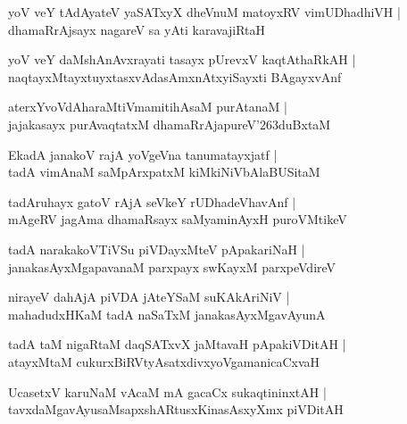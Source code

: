 \documentclass[twoside,12pt,openright]{book}
\def\S{\char'263}
\newcounter{shloka}[chapter]
\begin{document}
\begin{shloka}%
yoV veY tAdAyateV yaSATxyX dheVnuM matoyxRV vimUDhadhiVH |\\
dhamaRrAjsayx nagareV sa yAti karavajiRtaH 
\end{shloka}

\begin{shloka}%
yoV veY daMshAnAvxrayati tasayx pUrevxV kaqtAthaRkAH |\\
naqtayxMtayxtuyxtasxvAdasAmxnAtxyiSayxti BAgayxvAnf 
\end{shloka}

\begin{shloka}%
aterxYvoVdAharaMtiVmamitihAsaM purAtanaM |\\
jajakasayx purAvaqtatxM dhamaRrAjapureV\S duBxtaM 
\end{shloka}

\begin{shloka}%
EkadA janakoV rajA yoVgeVna tanumatayxjatf |\\
tadA vimAnaM saMpArxpatxM kiMkiNiVbAlaBUSitaM 
\end{shloka}

\begin{shloka}%
tadAruhayx gatoV rAjA seVkeY rUDhadeVhavAnf |\\
mAgeRV jagAma dhamaRsayx saMyaminAyxH puroVMtikeV 
\end{shloka}

\begin{shloka}%
tadA narakakoVTiVSu piVDayxMteV pApakariNaH |\\
janakasAyxMgapavanaM parxpayx swKayxM parxpeVdireV 
\end{shloka}

\begin{shloka}%
nirayeV dahAjA piVDA jAteYSaM suKAkAriNiV |\\
mahadudxHKaM tadA naSaTxM janakasAyxMgavAyunA 
\end{shloka}

\begin{shloka}%
tadA taM nigaRtaM daqSATxvX jaMtavaH pApakiVDitAH |\\
atayxMtaM cukurxBiRVtyAsatxdivxyoVgamanicaCxvaH 
\end{shloka}

\begin{shloka}%
UcasetxV karuNaM vAcaM mA gacaCx sukaqtininxtAH |\\
tavxdaMgavAyusaMsapxshARtusxKinasAsxyXmx piVDitAH 
\end{shloka}
\end{document}
